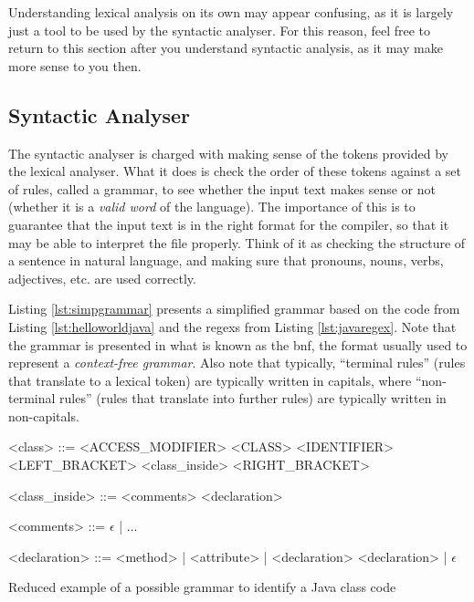 Understanding lexical analysis on its own may appear confusing, as it is largely just a tool to be used by the syntactic analyser. For this reason, feel free to return to this section after you understand syntactic analysis, as it may make more sense to you then.


\subsection{Syntactic Analyser}
\label{sc:syn}

The syntactic analyser is charged with making sense of the tokens provided by the lexical analyser. What it does is check the order of these tokens against a set of rules, called a \gls{grammar}, to see whether the input text makes sense or not (whether it is a \emph{valid word} of the language). The importance of this is to guarantee that the input text is in the right format for the compiler, so that it may be able to interpret the file properly. Think of it as checking the structure of a sentence in natural language, and making sure that pronouns, nouns, verbs, adjectives, etc. are used correctly.

Listing \ref{lst:simpgrammar} presents a simplified grammar based on the code from Listing \ref{lst:helloworldjava} and the \gls{regex}s from Listing \ref{lst:javaregex}. Note that the \gls{grammar} is presented in what is known as the \acrfull{bnf}, the format usually used to represent a \emph{context-free grammar}. Also note that typically, ``terminal rules'' (rules that translate to a lexical token) are typically written in capitals, where ``non-terminal rules'' (rules that translate into further rules) are typically written in non-capitals.

\begin{listing}
\begin{grammar}
<class> ::= <ACCESS_MODIFIER> <CLASS> <IDENTIFIER> <LEFT_BRACKET> <class_inside> <RIGHT_BRACKET>

<class_inside> ::= <comments> <declaration>

<comments> ::= $\epsilon$ | ...

<declaration> ::= <method> | <attribute> | <declaration> <declaration> | $\epsilon$
\end{grammar}
\caption{Reduced example of a possible grammar to identify a Java class code} \label{lst:simpgrammar}
\end{listing}

